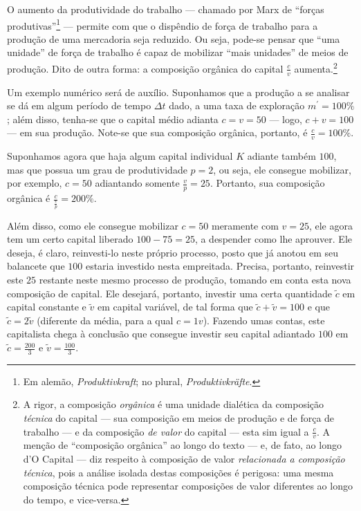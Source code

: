 \documentclass[12pt]{article}
\numberwithin{equation}{section}
\theoremstyle{plain}
\theoremstyle{definition}
\theoremstyle{remark}
\begin{document}
O aumento da produtividade do trabalho — chamado por Marx de ``forças produtivas''\footnote{Em alemão, \textit{Produktivkraft}; no plural, \textit{Produktivkräfte}.} — permite com que o dispêndio de força de trabalho para a produção de uma mercadoria seja reduzido. Ou seja, pode-se pensar que ``uma unidade'' de força de trabalho é capaz de mobilizar ``mais unidades'' de meios de produção. Dito de outra forma: a composição orgânica do capital $\frac{c}{v}$ aumenta.\footnote{A rigor, a composição \textit{orgânica} é uma unidade dialética da composição \textit{técnica} do capital — sua composição em meios de produção e de força de trabalho — e da composição \textit{de valor} do capital — esta sim igual a $\frac{c}{v}$. A menção de ``composição orgânica'' ao longo do texto — e, de fato, ao longo d'O Capital — diz respeito à composição de valor \textit{relacionada a composição técnica}, pois a análise isolada destas composições é perigosa: uma mesma composição técnica pode representar composições de valor diferentes ao longo do tempo, e vice-versa.}

Um exemplo numérico será de auxílio. Suponhamos que a produção a se analisar se dá em algum período de tempo $\Delta t$ dado, a uma taxa de exploração $m^{\prime}=100\%$; além disso, tenha-se que o capital médio adianta $c=v=50$ — logo, $c+v=100$ — em sua produção. Note-se que sua composição orgânica, portanto, é $\frac{c}{v}=100\%$.

Suponhamos agora que haja algum capital individual $K$ adiante também $100$, mas que possua um grau de produtividade $p=2$, ou seja, ele consegue mobilizar, por exemplo, $c=50$ adiantando somente $\frac{v}{p}=25$. Portanto, sua composição orgânica é $\frac{c}{\frac{v}{p}}=200\%$. 

Além disso, como ele consegue mobilizar $c=50$ meramente com $v=25$, ele agora tem um certo capital liberado $100-75=25$, a despender como lhe aprouver. Ele deseja, é claro, reinvesti-lo neste próprio processo, posto que já anotou em seu balancete que $100$ estaria investido nesta empreitada. Precisa, portanto, reinvestir este $25$ restante neste mesmo processo de produção, tomando em conta esta nova composição de capital. Ele desejará, portanto, investir uma certa quantidade $\tilde{c}$ em capital constante e $\tilde{v}$ em capital variável, de tal forma que $\tilde{c}+\tilde{v}=100$ e que $\tilde{c} = 2 \tilde{v}$ (diferente da média, para a qual $c=1v$). Fazendo umas contas, este capitalista chega à conclusão que consegue investir seu capital adiantado $100$ em $\tilde{c}=\frac{200}{3}$ e $\tilde{v}=\frac{100}{3}$.
\end{document}
